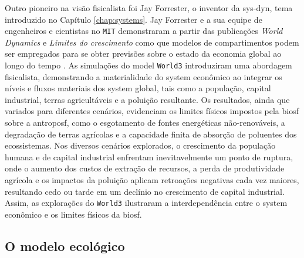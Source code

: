 \documentclass[./main.tex]{subfiles}
\begin{document}
\par Outro pioneiro na visão fisicalista foi Jay Forrester, o inventor da \gls{sys-dyn}, tema introduzido no Capítulo \ref{chap:systems}. Jay Forrester e a sua equipe de engenheiros e cientistas no \texttt{MIT} demonstraram a partir das publicações \textit{World Dynamics} e \textit{Limites do crescimento} como que modelos de compartimentos podem ser empregados para se obter previsões sobre o estado da economia global ao longo do tempo \cite{Forrester1973a, meadows1974}. As simulações do \gls{model} \texttt{World3} introduziram uma abordagem fisicalista, demonstrando a materialidade do \gls{system} econômico ao integrar os níveis e fluxos materiais dos \gls{system} global, tais como a população, capital industrial, terras agricultáveis e a poluição resultante. Os resultados, ainda que variados para diferentes cenários, evidenciam os limites físicos impostos pela \gls{biosf} sobre a \gls{antroposf}, como o esgotamento de fontes energéticas não-renováveis, a degradação de terras agrícolas e a capacidade finita de absorção de poluentes dos ecossistemas. Nos diversos cenários explorados, o crescimento da população humana e de capital industrial enfrentam inevitavelmente um ponto de ruptura, onde o aumento dos custos de extração de recursos, a perda de produtividade agrícola e os impactos da poluição aplicam retroações negativas cada vez maiores, resultando cedo ou tarde em um declínio no crescimento de capital industrial. Assim, as explorações do \texttt{World3} ilustraram a interdependência entre o \gls{system} econômico e os limites físicos da \gls{biosf}.

\subsection{O modelo ecológico} \label{subsec:ecomodel}
\end{document}
